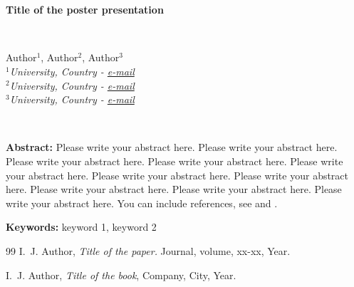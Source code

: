\documentclass[11pt,reqno]{article}
\begin{document}
\begin{center}

\

\

\Large{\bf Title of the poster presentation} %

\

\normalsize{Author$^{1}$, Author$^{2}$, Author$^{3}$}\\ %

$^{1}$\small{\em University, Country - {\rm\url{e-mail}}}\\ %
$^{2}$\small{\em University, Country - {\rm\url{e-mail}}}\\
$^{3}$\small{\em University, Country - {\rm\url{e-mail}}}

\end{center}
\

\noindent\textbf{Abstract:} %
Please write your abstract here. Please write your abstract here. Please write your abstract here. Please write your abstract here. Please write your abstract here. Please write your abstract here. Please write your abstract here. Please write your abstract here. Please write your abstract here. Please write your abstract here. You can include references, see \cite{reference1} and \cite{book}.


\medskip


\noindent\textbf{Keywords:} keyword 1, keyword 2




\begin{thebibliography}{99}
 {\sc I.~J. Author,} {\it Title of the paper.}  Journal,
  {volume, xx-xx, Year.}

 {\sc I.~J. Author,} {\it Title of the book}, {Company,
    City, Year.}

\end{thebibliography}
\end{document}
